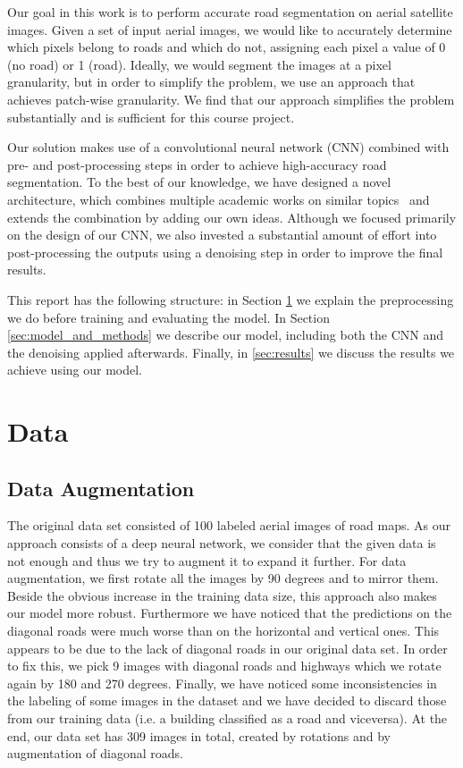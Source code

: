 \documentclass[10pt,conference,compsocconf]{IEEEtran}
\begin{document}
Our goal in this work is to perform accurate road segmentation on aerial
satellite images. Given a set of input aerial images, we would like to
accurately determine which pixels belong to roads and which do not, assigning
each pixel a value of 0 (no road) or 1 (road). Ideally, we would segment the
images at a pixel granularity, but in order to simplify the problem, we use an
approach that achieves patch-wise granularity. We find that our approach
simplifies the problem substantially and is sufficient for this course
project. 

Our solution makes use of a convolutional neural network (CNN) combined with
pre- and post-processing steps in order to achieve high-accuracy road
segmentation.  To the best of our knowledge, we have designed a novel
architecture, which combines multiple academic works on similar
topics~\cite{mthesis,Mnih2010,vgg,xavier} and extends the combination by adding
our own ideas. Although we focused primarily on the design of our CNN, we also
invested a substantial amount of effort into post-processing the outputs using
a denoising step in order to improve the final results.

This report has the following structure: in Section \ref{sec:Data} we explain
the preprocessing we do before training and evaluating the model. In Section
\ref{sec:model_and_methods} we describe our model, including both the CNN and
the denoising applied afterwards. Finally, in \ref{sec:results} we discuss the
results we achieve using our model.


\section{Data}
\label{sec:Data}

\subsection{Data Augmentation}
\label{sec:data_aug}
The original data set consisted of 100 labeled aerial images of road maps. As our approach consists of a
deep neural network, we consider that the given data is not enough and thus we try to augment it to expand it further.
For data augmentation, we first rotate all the images by 90 degrees and to mirror them. Beside the obvious increase
in the training data size, this approach also makes our model more robust. Furthermore we have noticed that the 
predictions on the diagonal roads were much worse than on the horizontal and vertical ones. This appears to be due to
the lack of diagonal roads in our original data set. In order to fix this, we pick 9 images with diagonal
roads and highways which we rotate again by 180 and 270 degrees. Finally, we have noticed some inconsistencies
in the labeling of some images  in the dataset and we have decided to discard those from our training data (i.e. a building classified as a road and viceversa). At the end, our data set has 309 images in total, created by rotations and by augmentation of diagonal roads.
\end{document}
